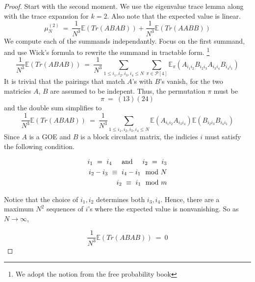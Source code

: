 \documentclass{article}
\newcommand{\textAnd}{
    {
        \hspace{5mm}
        \textrm{and}
        \hspace{5mm}
    }
}
\begin{document}
\begin{proof}
    Start with the second moment. 
    We use the eigenvalue trace lemma along with the trace expansion 
    for $k = 2$. Also note that the expected value is linear. 
\begin{equation}
    \label{eqn:secondGOEBC}
    \mu_N^{(2)} \ = \ \frac 1 {N^{3}} \mathbb{E}(Tr(ABAB)) + \frac 1 {N^3}\mathbb{E}(Tr(AABB))
\end{equation}
We compute each of the summands independantly. Focus on the first 
summand, and use Wick's formula to rewrite the summand in tractable 
form. \footnote{We adopt the notion from the free probability book}
\begin{equation}
    \frac 1 {N^{3}} \mathbb{E}(Tr(ABAB)) \
    =  \
    \frac 1 {N^3} 
    \sum_{1 \leq i_1, i_2, i_3, i_4 \leq N} 
    \sum_{\pi \in \mathcal{P}[4]}
    \mathbb{E}_\pi (
        A_{i_1i_2}B_{i_2i_3}A_{i_3i_4}B_{i_4i_1}
    )
\end{equation}
It is trivial that the pairings that match $A$'s with $B$'s 
vanish, for the two matricies $A$, $B$ are assumed to be indepent. 
Thus, the permutation $\pi$ must be 
\[
    \pi \ = \ (13)(24)
\]
and the double sum simplifies to 
\begin{equation}
    \frac 1 {N^{3}} \mathbb{E}(Tr(ABAB)) \
    =  \
    \frac 1 {N^3} 
    \sum_{1 \leq i_1, i_2, i_3, i_4 \leq N}
    \mathbb{E} (
        A_{i_1i_2}A_{i_3i_4}
    )
\mathbb{E} (
        B_{i_2i_3}B_{i_4i_1}
    )
\end{equation}
Since $A$ is a GOE and $B$ is a block circulant matrix, the indicies $i$ must 
satisfy the following condition. 

\begin{eqnarray}
    i_1 \ = \ i_4 \textAnd i_2 \ = \ i_3 \\
    i_2 - i_3 \ \equiv \ i_4 - i_1 \mod N \\
    i_2 \ \equiv \ i_1 \mod m
\end{eqnarray}

Notice that the choice of $i_1, i_2$ determines both $i_3, i_4$. Hence, 
there are a maximum $N^2$ sequences of $i$'s where the expected value 
is nonvanishing. So as $N \rightarrow \infty$, 

\begin{equation}
    \frac 1 {N^{3}} \mathbb{E}(Tr(ABAB)) \
    =  \ 0
\end{equation}


\end{proof}
\end{document}
